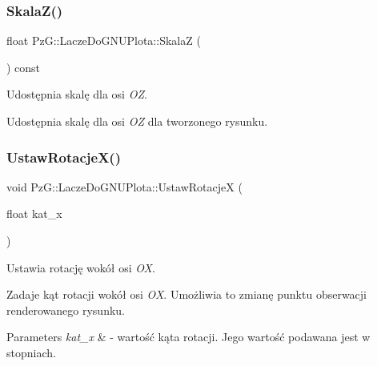 \subsubsection{\texorpdfstring{Skala\+Z()}{SkalaZ()}}
{\footnotesize\ttfamily float Pz\+G\+::\+Lacze\+Do\+G\+N\+U\+Plota\+::\+SkalaZ (\begin{DoxyParamCaption}{ }\end{DoxyParamCaption}) const\hspace{0.3cm}{\ttfamily [inline]}}



Udostępnia skalę dla osi {\itshape OZ}. 

Udostępnia skalę dla osi {\itshape OZ} dla tworzonego rysunku. \mbox{\label{classPzG_1_1LaczeDoGNUPlota_a88324c53a70846fb6bc9d918ce21fd56}} 
\subsubsection{\texorpdfstring{Ustaw\+Rotacje\+X()}{UstawRotacjeX()}}
{\footnotesize\ttfamily void Pz\+G\+::\+Lacze\+Do\+G\+N\+U\+Plota\+::\+Ustaw\+RotacjeX (\begin{DoxyParamCaption}\item[{float}]{kat\+\_\+x }\end{DoxyParamCaption})\hspace{0.3cm}{\ttfamily [inline]}}



Ustawia rotację wokół osi {\itshape OX}. 

Zadaje kąt rotacji wokół osi {\itshape OX}. Umożliwia to zmianę punktu obserwacji renderowanego rysunku. 
\begin{DoxyParams}{Parameters}
{\em kat\+\_\+x} & -\/ wartość kąta rotacji. Jego wartość podawana jest w stopniach. \\
\hline
\end{DoxyParams}
\mbox{\label{classPzG_1_1LaczeDoGNUPlota_a94d8527fd78048ed6cb32ffb29e5f903}} 
